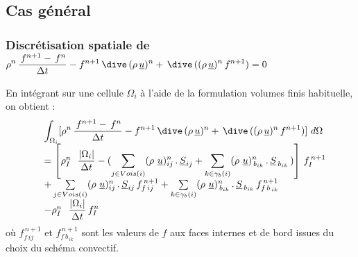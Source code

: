\subsection*{Cas g\'en\'eral}


\subsubsection* {Discr\'etisation spatiale de $ \displaystyle \rho^n \,\frac {\,f^{n+1} -\,f^n}{\Delta t} -
f^{n+1}\,\dive\,(\rho\,\underline{u})^n +
\,\dive\,((\rho\,\underline{u})^n\,f^{n+1}) = 0$}

En int\'egrant sur une cellule $\Omega_i$ \`a l'aide de la formulation volumes
finis habituelle, on obtient :
\begin{equation}
\begin{array}{lll}
&\displaystyle\int_{\Omega_i}[\displaystyle \rho^n \,\frac {\,f^{n+1} -\,f^n}{\Delta t} -
f^{n+1}\,\dive\,(\rho\,\underline{u})^n +
\,\dive\,((\rho\,\underline{u})^n\,f^{n+1})]\ d\Omega \\
&= \left[\rho_I^n\ \displaystyle\ \frac{|\Omega_i|}{\Delta t}  -
(\sum\limits_{j\in Vois(i)}(\rho\
\underline{u})^{n}_{ij}\,.\,\underline{S}_{ij} + \sum\limits_{k\in
{\gamma_b(i)}}(\rho\
\underline{u})^{n}_{\,b_{ik}}\,.\,\underline{S}_{\,b_{ik}}\,)\right]\, f_I^{\,n+1} \\
&+\sum\limits_{j\in Vois(i)} (\rho\
\underline{u})^{n}_{ij}\,.\,\underline{S}_{ij}\,
f^{\,n+1}_{f\,ij}+\sum\limits_{k\in {\gamma_b(i)}} (\rho\
\underline{u})^{n}_{\,b_{ik}}\,.\,\underline{S}_{\,b_{ik}}\,f^{\,n+1}_{f\,{b_{\,ik}}}
\\
&-\rho_I^n\ \displaystyle\ \frac{|\Omega_i|}{\Delta t}\,f_I^n \\
\end{array}
\end{equation}
o\`{u} $f^{\,n+1}_{f\,ij}$ et $f^{\,n+1}_{f\,{b_{\,ik}}}$ sont les valeurs de $f$
aux faces internes et de bord issues du choix du sch\'{e}ma convectif.

